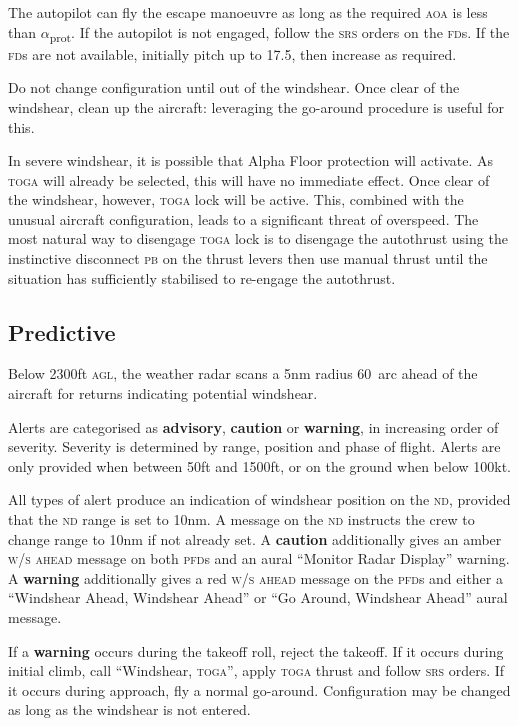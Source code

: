 \documentclass[a5paper,11pt,twoside]{book}
\newcommand{\ac}[1]{{\scshape\MakeLowercase{#1}}}
\newcommand{\cphrase}[1]{\ac{#1}}
\newcommand{\inlcite}[1]{{\ac{#1}}}
\newcommand{\multicite}[1]{%
  \nopagebreak
  \noindent{{\color{blue}\footnotesize[ \inlcite{#1} ]}}
}
\newcommand{\strong}[1]{\textbf{#1}}
\begin{document}
The autopilot can fly the escape manoeuvre as long as the required \ac{AOA} is
less than $\alpha$\textsubscript{prot}. If the autopilot is not engaged, follow
the \ac{SRS} orders on the \ac{FD}s. If the \ac{FD}s are not available,
initially pitch up to 17.5\textdegree, then increase as required.

Do not change configuration until out of the windshear. Once clear of the
windshear, clean up the aircraft: leveraging the go-around procedure is useful
for this.

In severe windshear, it is possible that Alpha Floor protection will
activate. As \ac{TOGA} will already be selected, this will have no immediate
effect. Once clear of the windshear, however, \ac{TOGA} lock will be
active. This, combined with the unusual aircraft configuration, leads to a
significant threat of overspeed. The most natural way to disengage \ac{TOGA}
lock is to disengage the autothrust using the instinctive disconnect \ac{PB} on
the thrust levers then use manual thrust until the situation has sufficiently
stabilised to re-engage the autothrust.

\multicite{FCOM~PRO.AEP.SURV}

\subsection{Predictive}

Below 2300ft \ac{AGL}, the weather radar scans a 5nm radius 60\textdegree\ arc
ahead of the aircraft for returns indicating potential windshear.

Alerts are categorised as \strong{advisory}, \strong{caution} or
\strong{warning}, in increasing order of severity. Severity is determined by
range, position and phase of flight. Alerts are only provided when between 50ft
and 1500ft, or on the ground when below 100kt.

All types of alert produce an indication of windshear position on the \ac{ND},
provided that the \ac{ND} range is set to 10nm. A message on the \ac{ND}
instructs the crew to change range to 10nm if not already set. A
\strong{caution} additionally gives an amber \cphrase{W/S AHEAD} message on
both \ac{PFD}s and an aural ``Monitor Radar Display'' warning. A
\strong{warning} additionally gives a red \cphrase{W/S AHEAD} message on the
\ac{PFD}s and either a ``Windshear Ahead, Windshear Ahead'' or ``Go Around,
Windshear Ahead'' aural message.

If a \strong{warning} occurs during the takeoff roll, reject the takeoff. If it
occurs during initial climb, call ``Windshear, \ac{TOGA}'', apply \ac{TOGA}
thrust and follow \ac{SRS} orders. If it occurs during approach, fly a normal
go-around. Configuration may be changed as long as the windshear is not entered.
\end{document}
